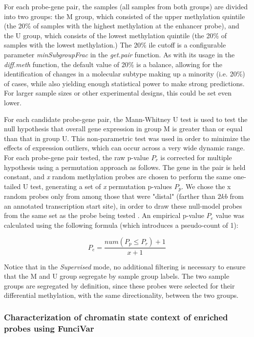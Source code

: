 For each probe-gene pair, the samples (all samples from both groups) are divided into two 
groups: the M group, which consisted of the upper methylation quintile (the 20\%
of samples with the highest methylation at the enhancer probe), and the U group, 
which consists of the lowest methylation quintile (the 20\% of samples with the 
lowest methylation.) The 20\% ile cutoff is a configurable parameter \textit{minSubgroupFrac} in the \textit{get.pair} function.
As with its usage in the \textit{diff.meth} function, the default value of 20\% is a balance, allowing for the identification of changes in a 
molecular subtype making up a minority (i.e. 20\%) of cases, while also yielding 
enough statistical power to make strong predictions. For larger sample sizes or other experimental designs, this could be set even lower.

For each candidate probe-gene pair, 
the Mann-Whitney U test is used to test the null hypothesis that overall gene 
expression in group M is greater than or equal than that in group U. 
This non-parametric test was used in order to minimize the effects 
of expression outliers, which can  occur across a very wide dynamic range. 
For each probe-gene pair tested, the raw p-value $P_r$ is corrected for multiple 
hypothesis using a permutation approach as follows.
The gene in the pair is held constant, and \textit{x} random methylation probes are 
chosen to perform the same one-tailed U test, generating a set of \textit{x} permutation
p-values $P_p$. We chose the x random probes only from among those that were 
"distal" (farther than $2kb$ from an annotated transcription start site), in order 
to draw these null-model probes from the same set as the probe being tested \cite{sham2014statistical}. 
An empirical p-value $P_e$ value was calculated using the following formula 
(which introduces a pseudo-count of 1):

$$P_e = \frac{num(P_p \leq P_r)+ 1}{x+1}$$

Notice that in the \textit{Supervised} mode, no additional filtering is necessary to ensure that the M and U group segregate by sample group labels.  The two sample groups are segregated by definition, since these probes were selected for their differential methylation, with the same directionality, between the two groups. 



\subsubsection*{Characterization of chromatin state context of enriched probes using FunciVar}

